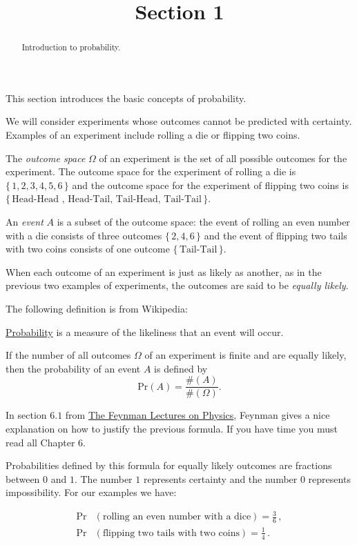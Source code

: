 \documentclass{ximera}
\title{Section 1}
\begin{document}
\begin{abstract}
Introduction to probability.
\end{abstract}
\maketitle

This section introduces the basic concepts of probability. \vspace{.25cm}

We will consider experiments whose outcomes cannot be predicted with certainty. Examples of an experiment include rolling a die or flipping two coins.

The {\it outcome space} $\Omega$ of an experiment is the set of all possible outcomes for the experiment. The outcome space for the experiment of rolling a die is $\{\,1,2,3,4,5,6\,\}$ and the outcome space for the experiment of flipping two coins is $\{\, \text{Head-Head , Head-Tail, Tail-Head, Tail-Tail} \,\}$.

An {\it event} $A$ is a subset of the outcome space: the event of rolling an even number with a die consists of three outcomes $\{\,2,4,6\,\}$ and the event of flipping two tails with two coins consists of one outcome $\{\, \text{Tail-Tail} \,\}$. 

When each outcome of an experiment is just as likely as another, as in the previous two examples of experiments, the outcomes are said to be {\it equally likely}. \vspace{.25cm}

The following definition is from Wikipedia: 

\href{http://en.wikipedia.org/wiki/Probability}{Probability} is a measure of the likeliness that an event will occur. \vspace{.25cm}

If the number of all outcomes $\Omega$ of an experiment is finite and are equally likely, then the probability of an event $A$ is defined by
\[
\text{Pr}(A) = \frac{ \#(A) }{ \#(\Omega)}.
\]

In section $6.1$ from \href{ http://www.feynmanlectures.caltech.edu/I_06.html#Ch6-S1}{The Feynman Lectures on Physics}, Feynman gives a nice explanation on how to justify the previous formula. If you have time you must read all Chapter $6$. \vspace{.25cm}

Probabilities defined by this formula for equally likely outcomes are fractions between $0$ and $1$. The number $1$ represents certainty and the number $0$ represents impossibility. 
For our examples we have:

\begin{align*}
\text{Pr}&( \text{rolling an even number with a dice} ) = \frac{3}{6}\,,  \\
\text{Pr}&( \text{flipping two tails with two coins} ) = \frac{1}{4}\,.
\end{align*}
\end{document}
